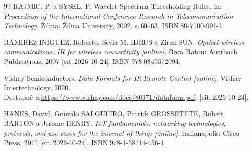 \begin{thebibliography}{99}
    RAJMIC, P. a SYSEL, P.
    Wavelet Spectrum Thresholding Rules.
    In: \emph{Proceedings of the International Conference Research in Telecommunication Technology}.
    Žilina: Žilina University, 2002. s.\,60--63. ISBN 80-7100-991-1.

	RAMIREZ-INIGUEZ, Roberto, Sevia M. IDRUS a Ziran SUN.
	\emph{Optical wireless communications: IR for wireless connectivity [online].}
	Boca Raton: Auerbach Publications, 2007 [cit.\,2026-10-24].
	ISBN 978-0849372094.

	Vishay Semiconductors.
	\emph{Data Formats for IR Remote Control [online].}
	Vishay Intertechnology, 2020.
	Dostupné~z:\url{https://www.vishay.com/docs/80071/dataform.pdf}. [cit.\,2026-10-24].

	HANES, David, Gonzalo SALGUEIRO, Patrick GROSSETETE, Robert BARTON a Jerome HENRY.
	\emph{IoT fundamentals: networking technologies, protocols, and use cases for the internet of things [online].}
	Indianapolis: Cisco Press, 2017 [cit.\,2026-10-24].
	ISBN 978-1-58714-456-1.

\end{thebibliography}


%
%


